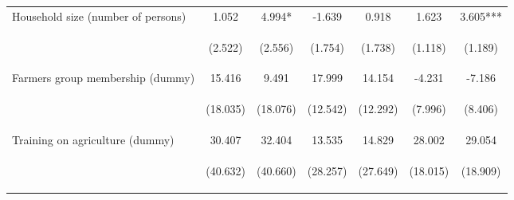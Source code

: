\begin{center}
\begin{tabular}{lcccccc}
Household size (number of persons) & 1.052 & 4.994* & -1.639 & 0.918 & 1.623 & 3.605*** \\
\vspace{4pt} & \begin{footnotesize}(2.522)\end{footnotesize} & \begin{footnotesize}(2.556)\end{footnotesize} & \begin{footnotesize}(1.754)\end{footnotesize} & \begin{footnotesize}(1.738)\end{footnotesize} & \begin{footnotesize}(1.118)\end{footnotesize} & \begin{footnotesize}(1.189)\end{footnotesize} \\
Farmers group membership (dummy) & 15.416 & 9.491 & 17.999 & 14.154 & -4.231 & -7.186 \\
\vspace{4pt} & \begin{footnotesize}(18.035)\end{footnotesize} & \begin{footnotesize}(18.076)\end{footnotesize} & \begin{footnotesize}(12.542)\end{footnotesize} & \begin{footnotesize}(12.292)\end{footnotesize} & \begin{footnotesize}(7.996)\end{footnotesize} & \begin{footnotesize}(8.406)\end{footnotesize} \\
Training on agriculture (dummy) & 30.407 & 32.404 & 13.535 & 14.829 & 28.002 & 29.054 \\
\vspace{4pt} & \begin{footnotesize}(40.632)\end{footnotesize} & \begin{footnotesize}(40.660)\end{footnotesize} & \begin{footnotesize}(28.257)\end{footnotesize} & \begin{footnotesize}(27.649)\end{footnotesize} & \begin{footnotesize}(18.015)\end{footnotesize} & \begin{footnotesize}(18.909)\end{footnotesize} \\

\end{tabular}
\end{center}

